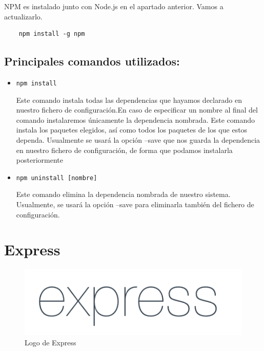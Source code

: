 \documentclass[openright,twoside,10pt]{book}
\begin{document}
    NPM es instalado junto con Node.js en el apartado anterior. Vamos a
    actualizarlo.
    
    \begin{verbatim}
    npm install -g npm
    \end{verbatim}
    
    \subsection{Principales comandos
    utilizados:}\label{principales-comandos-utilizados}
    
    \begin{itemize}
    \item
      \texttt{npm\ install}
    
      Este comando instala todas las dependencias que hayamos declarado en
      nuestro fichero de configuración.En caso de especificar un nombre al
      final del comando instalaremos únicamente la dependencia nombrada.
      Este comando instala los paquetes elegidos, así como todos los
      paquetes de los que estos dependa. Usualmente se usará la opción
      --save que nos guarda la dependencia en nuestro fichero de
      configuración, de forma que podamos instalarla posteriormente
    \item
      \texttt{npm\ uninstall\ {[}nombre{]}}
    
      Este comando elimina la dependencia nombrada de nuestro sistema.
      Usualmente, se usará la opción --save para eliminarla también del
      fichero de configuración.
    \end{itemize}
    
    \section{Express}\label{express}
    
    \begin{figure}[H]
        \begin{center}
            \includegraphics[scale=0.3]{img/express.png}
        \end{center}
        \caption{Logo de Express}
    \end{figure}
    
\end{document}
